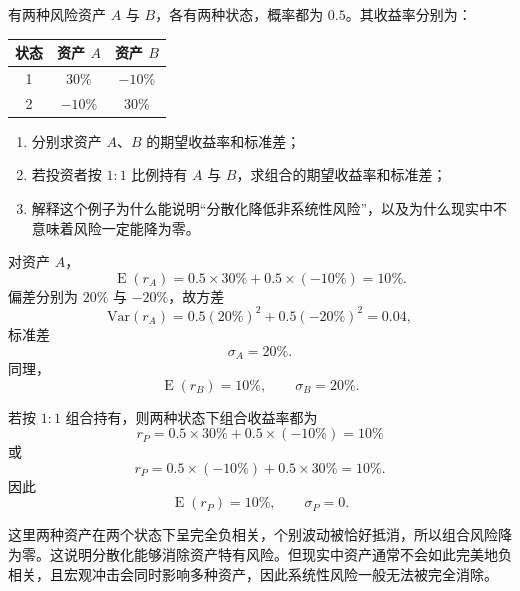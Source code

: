 \begin{question}
有两种风险资产 $A$ 与 $B$，各有两种状态，概率都为 $0.5$。其收益率分别为：

\begin{center}
\begin{tabular}{c|cc}
状态 & 资产 $A$ & 资产 $B$\\ \hline
1 & $30\%$ & $-10\%$\\
2 & $-10\%$ & $30\%$
\end{tabular}
\end{center}

\begin{enumerate}[label=(\arabic*),leftmargin=2.5em]
  \item 分别求资产 $A$、$B$ 的期望收益率和标准差；
  \item 若投资者按 $1:1$ 比例持有 $A$ 与 $B$，求组合的期望收益率和标准差；
  \item 解释这个例子为什么能说明“分散化降低非系统性风险”，以及为什么现实中不意味着风险一定能降为零。
\end{enumerate}

\begin{solution}
对资产 $A$，
\[
\operatorname{E}(r_A)=0.5\times 30\%+0.5\times(-10\%)=10\%.
\]
偏差分别为 $20\%$ 与 $-20\%$，故方差
\[
\mathrm{Var}(r_A)=0.5(20\%)^2+0.5(-20\%)^2=0.04,
\]
标准差
\[
\sigma_A=20\%.
\]
同理，
\[
\operatorname{E}(r_B)=10\%,\qquad \sigma_B=20\%.
\]

若按 $1:1$ 组合持有，则两种状态下组合收益率都为
\[
r_P=0.5\times 30\%+0.5\times (-10\%)=10\%
\]
或
\[
r_P=0.5\times (-10\%)+0.5\times 30\%=10\%.
\]
因此
\[
\operatorname{E}(r_P)=10\%,\qquad \sigma_P=0.
\]

这里两种资产在两个状态下呈完全负相关，个别波动被恰好抵消，所以组合风险降为零。这说明分散化能够消除资产特有风险。但现实中资产通常不会如此完美地负相关，且宏观冲击会同时影响多种资产，因此系统性风险一般无法被完全消除。
\end{solution}
\end{question}

